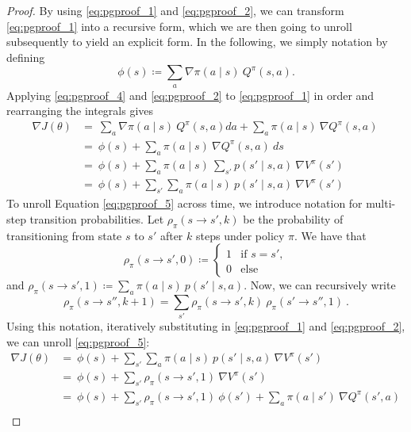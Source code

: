 \begin{proof}
    By using \eqref{eq:pgproof_1} and \eqref{eq:pgproof_2}, we can transform \eqref{eq:pgproof_1} into a recursive form, which we are then going to unroll subsequently to yield an explicit form. In the following, we simply notation by defining 
	\begin{equation}
		\label{eq:pgproof_4}
		\phi(s) \coloneqq \sum_{a} \nabla \pi(a \mid s) \: Q^\pi(s,a).
	\end{equation}
	Applying \eqref{eq:pgproof_4} and \eqref{eq:pgproof_2} to \eqref{eq:pgproof_1} in order and rearranging the integrals gives
	\begin{align}
		\nabla J(\theta) &=  \: \sum_{a} \nabla \pi(a \mid s) \: Q^\pi(s,a) da + \sum_{a} \pi(a \mid s) \: \nabla Q^\pi(s,a) \:  \nonumber \\
		&=  \: \phi(s) +  \sum_{a} \pi(a \mid s) \: \nabla Q^\pi(s,a) \: ds \nonumber \\
		&=  \: \phi(s) + \sum_{a} \pi(a \mid s) \: \sum_{s'} p(s' \mid s,a) \: \nabla V^\pi(s') \: \:  \nonumber \\
		&=  \: \phi(s) + \sum_{s'} \sum_{a} \pi(a \mid s) \: p(s' \mid s,a) \: \nabla V^\pi(s') \: \:  \label{eq:pgproof_5}
	\end{align}
	To unroll Equation \eqref{eq:pgproof_5} across time, we introduce notation for multi-step transition probabilities. Let \(\rho_\pi (s \to s', k)\) be the probability of transitioning from state \(s\) to \(s'\) after \(k\) steps under policy \(\pi\). We have that 
	\[\rho_\pi (s \to s', 0) \coloneqq 
	\begin{cases}
		1 & \text{if } s = s',\\
		0 & \text{else}
	\end{cases}
	\] 	
	and \(\rho_\pi (s \to s', 1) \coloneqq \sum_{a} \pi(a \mid s) \: p(s' \mid s,a)\). 
	Now, we can recursively write
	\[\rho_\pi (s \to s'', k+1) = \sum_{s'} \rho_\pi (s \to s', k) \: \rho_\pi (s' \to s'', 1) \:.\]
	Using this notation, iteratively substituting in \eqref{eq:pgproof_1} and \eqref{eq:pgproof_2}, we can unroll \eqref{eq:pgproof_5}:
	\begin{align*}
		\nabla J(\theta) &=  \: \phi(s) + \sum_{s'} \sum_{a} \pi(a \mid s) \: p(s' \mid s,a) \: \nabla V^\pi(s') \: \:  \\
		&=  \: \phi(s) + \sum_{s'} \rho_\pi (s \to s', 1) \: \nabla V^\pi(s') \: \:  \\
		&=  \: \phi(s) + \sum_{s'} \rho_\pi (s \to s', 1) \: \phi(s') + \sum_{a} \pi(a \mid s') \: \nabla Q^\pi(s',a) \: \:  \\

\end{align*}
\end{proof}
